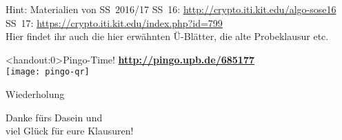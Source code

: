 





	
		
\begin{frame}{Hint: Materialien von SS~2016/17}
	\centering 
	\Large
	SS~16: \url{http://crypto.iti.kit.edu/algo-sose16} \\
	\bigskip
	SS~17: \url{https://crypto.iti.kit.edu/index.php?id=799} \\
	\bigskip
	\normalsize Hier findet ihr auch die hier erwähnten Ü-Blätter, die alte Probeklausur etc.
\end{frame}
	
\begin{frame}<handout:0>{Pingo-Time! \smiley}
	\centering
	\textbf{\large \url{http://pingo.upb.de/685177}} \\
	\texttt{[image: pingo-qr]}
\end{frame}
	
\begin{headframe}
	Wiederholung
\end{headframe}





	
\begin{headframe}
	Danke fürs Dasein und \\
	viel Glück für eure Klausuren! \smiley 
\end{headframe}
	

